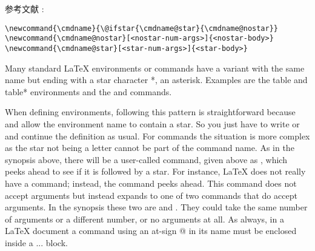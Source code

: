 参考文献 \cite{MANUAL}:

\begin{verbatim}
\newcommand{\cmdname}{\@ifstar{\cmdname@star}{\cmdname@nostar}}
\newcommand{\cmdname@nostar}[<nostar-num-args>]{<nostar-body>} 
\newcommand{\cmdname@star}[<star-num-args>]{<star-body>}
\end{verbatim}

Many standard {\LaTeX} environments or commands have a variant with the same name but ending with a star character *, an asterisk. Examples are the table and table* environments and the  and  commands.

When defining environments, following this pattern is straightforward because  and  allow the environment name to contain a star. So you just have to write  or  and continue the definition as usual. For commands the situation is more complex as the star not being a letter cannot be part of the command name. As in the synopsis above, there will be a user-called command, given above as , which peeks ahead to see if it is followed by a star. For instance, LaTeX does not really have a  command; instead, the  command peeks ahead. This command does not accept arguments but instead expands to one of two commands that do accept arguments. In the synopsis these two are  and . They could take the same number of arguments or a different number, or no arguments at all. As always, in a LaTeX document a command using an at-sign @ in its name must be enclosed inside a  ...  block.
